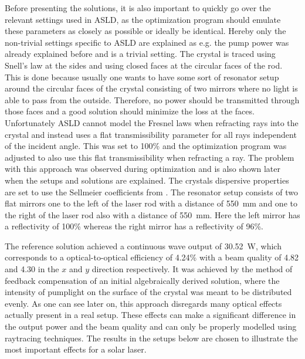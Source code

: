 \documentclass[a4paper,10pt]{article}
\begin{document}
    Before presenting the solutions, it is also important to quickly go
    over the relevant settings used
    in ASLD, as the optimization program should emulate these parameters
    as closely as possible or ideally be identical.
    Hereby only the non-trivial settings specific to ASLD are explained 
    as e.g. the pump power was already explained before and is a trivial
    setting.
    The crystal is traced using Snell's law at the sides
    and using closed faces at the circular faces of the rod.
    This is done because usually one wants to have some sort of resonator
    setup around the circular faces of the crystal consisting of 
    two mirrors where no light is able to pass from the outside.
    Therefore, no power should be transmitted through those faces
    and a good solution should minimize the loss at the faces.
    Unfortunately ASLD cannot model the Fresnel laws when refracting
    rays into the crystal and instead uses a flat transmissibility 
    parameter for all rays independent of the incident angle.
    This was set to 100\% and the optimization program was adjusted
    to also use this flat transmissibility when refracting a ray.
    The problem with this approach was observed during optimization
    and is also shown later when the setups and solutions are explained.
    The crystals dispersive properties are set to use the Sellmeier
    coefficients from \cite{sellmeier_ndyag}.
    The resonator setup consists of two flat mirrors one to the left of
    the laser rod with a distance of \SI{550}{mm} and one to the right
    of the laser rod also with a distance of \SI{550}{mm}.
    Here the left mirror has a reflectivity of 100\% whereas
    the right mirror has a reflectivity of 96\%.

    The reference solution achieved a continuous wave output of
    \SI{30.52}{W}, which corresponds to a optical-to-optical
    efficiency of 4.24\% with a beam quality of 4.82 
    and 4.30 in the $x$ and $y$ direction respectively.
    It was achieved by the method of feedback compensation of an 
    initial algebraically derived solution, where the intensity
    of pumplight on the surface of the crystal was meant to be
    distributed evenly.
    As one can see later on, this approach disregards many optical
    effects actually present in a real setup.
    These effects can make a significant difference in the output
    power and the beam quality and can only be properly modelled
    using raytracing techniques.
    The results in the setups below are chosen to illustrate
    the most important effects for a solar laser.
\end{document}
